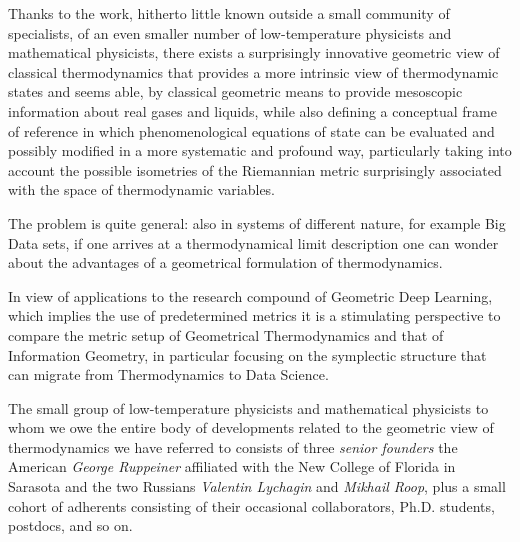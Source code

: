 \documentclass[10pt,a4paper]{article}
\begin{document}
Thanks to the work, hitherto little known outside a small community of specialists, of an even smaller number of low-temperature physicists and mathematical physicists, there exists a surprisingly innovative geometric view of classical thermodynamics that provides a more intrinsic view of thermodynamic states and seems able, by classical geometric means to provide mesoscopic information about
real gases and liquids, while also defining a conceptual frame of reference in which phenomenological equations of state can be evaluated and possibly modified in a more systematic and profound way, particularly taking into account the possible isometries of the Riemannian metric surprisingly associated with the space of thermodynamic variables.
\par
The problem is quite general: also in systems of different nature, for example Big Data sets, if one arrives at a thermodynamical limit description one can wonder about the advantages of a geometrical formulation of thermodynamics.
\par In view of  applications  to the research compound  of Geometric Deep Learning,  which implies the use of predetermined metrics it is a stimulating perspective to compare the metric setup of Geometrical Thermodynamics and that of Information Geometry, in particular focusing on the symplectic structure that can migrate from Thermodynamics to Data Science.
\par
The small group of low-temperature physicists and mathematical physicists to whom we owe the entire body of developments related to the geometric view of thermodynamics we have referred to consists of three \textit{senior founders} the American \textit{George Ruppeiner} affiliated with the New College of Florida in Sarasota and the two Russians \textit{Valentin Lychagin} and \textit{Mikhail Roop}, plus a small cohort of adherents consisting of their occasional collaborators, Ph.D. students, postdocs, and so on.
\end{document}
